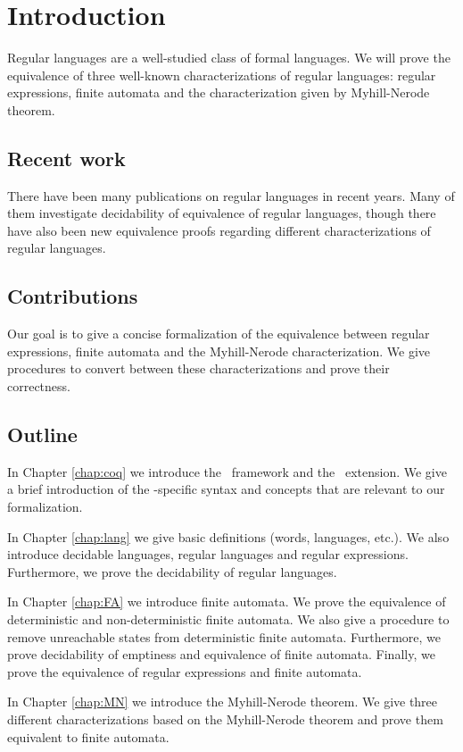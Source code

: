 \chapter{Introduction}
\label{chap:intro}

Regular languages are a well-studied class of formal languages. 
We will prove the equivalence of three well-known characterizations of regular languages: regular expressions, finite automata and the characterization given by Myhill-Nerode theorem.

\section{Recent work}

There have been many publications on regular languages in recent years. Many of them investigate decidability of equivalence of regular languages, though there have also been new equivalence proofs regarding different characterizations of regular languages.

\section{Contributions}
Our goal is to give a concise formalization of the equivalence between regular expressions, finite automata and the Myhill-Nerode characterization. 
We give procedures to convert between these characterizations and prove their correctness.

\section{Outline}
In Chapter \ref{chap:coq} we introduce the \coq\ framework and the \ssreflect\ extension. 
We give a brief introduction of the \ssreflect-specific syntax and concepts that are relevant to our formalization.

In Chapter \ref{chap:lang} we give basic definitions (words, languages, etc.). 
We also introduce decidable languages, regular languages and regular expressions. 
Furthermore, we prove the decidability of regular languages.

In Chapter \ref{chap:FA} we introduce finite automata. 
We prove the equivalence of deterministic and non-deterministic finite automata.
We also give a procedure to remove unreachable states from deterministic finite automata.
Furthermore, we prove decidability of emptiness and equivalence of finite automata.
Finally, we prove the equivalence of regular expressions and finite automata.

In Chapter \ref{chap:MN} we introduce the Myhill-Nerode theorem.
We give three different characterizations based on the Myhill-Nerode theorem and prove them equivalent to finite automata.
